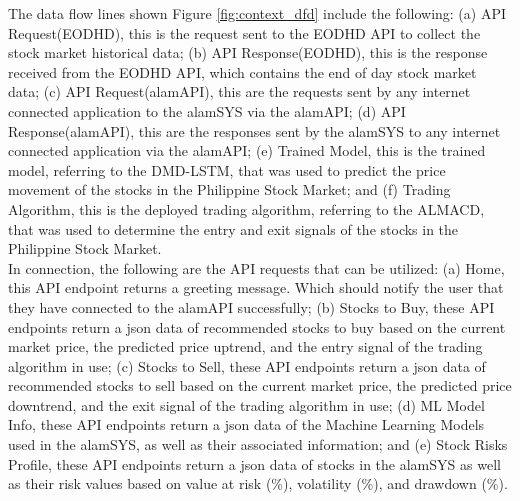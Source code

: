 The data flow lines shown Figure \ref{fig:context_dfd} include the following:
(a) API Request(EODHD), this is the request sent to the EODHD API to collect the 
stock market historical data; 
(b) API Response(EODHD), this is the response received from the 
EODHD API, which contains the end of day stock market data; 
(c) API Request(alamAPI), this are the requests sent by any 
internet connected application to the alamSYS via the alamAPI; 
(d) API Response(alamAPI), this are the responses sent by the alamSYS to 
any internet connected application via the alamAPI;
(e) Trained Model, this is the trained model, referring to the DMD-LSTM, 
that was used to predict the price movement of the stocks in the Philippine 
Stock Market; and
(f) Trading Algorithm, this is the deployed trading algorithm, referring to the ALMACD,
that was used to determine the entry and exit signals of the stocks in the Philippine 
Stock Market.
\\

In connection, the following are the API requests that can be utilized:
(a) Home, this API endpoint returns a greeting message. Which should notify the 
user that they have connected to the alamAPI successfully;
(b) Stocks to Buy, these API endpoints return a json data of recommended stocks to 
buy based on the current market price, the predicted price uptrend, and the entry signal of the
trading algorithm in use;
(c) Stocks to Sell, these API endpoints return a json data of recommended stocks to 
sell based on the current market price, the predicted price downtrend, and the exit signal of the
trading algorithm in use;
(d) ML Model Info, these API endpoints return a json data of the Machine Learning Models 
used in the alamSYS, as well as their associated information; and 
(e) Stock Risks Profile, these API endpoints return a json data of stocks in the 
alamSYS as well as their risk values based on value at risk (\%), volatility (\%), 
and drawdown (\%).
\\

